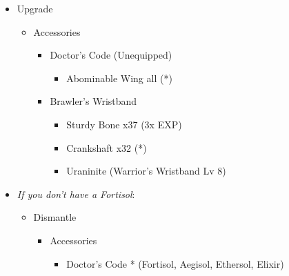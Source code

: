 	\begin{upgrade}
		\begin{itemize}
			\item Upgrade
			      \begin{itemize}
				      \item Accessories
				            \begin{itemize}
					            \item Doctor's Code (Unequipped)
					                  \begin{itemize}
						                  \item Abominable Wing all (*)
					                  \end{itemize}
					            \item Brawler's Wristband
					                  \begin{itemize}
						                  \item Sturdy Bone x37 (3x EXP)
						                  \item Crankshaft x32 (*)
						                  \item Uraninite (Warrior's Wristband Lv 8)
					                  \end{itemize}
				            \end{itemize}
			      \end{itemize}
		    \item \textit{If you don't have a Fortisol}:
			      \begin{itemize}
				      \item Dismantle
				            \begin{itemize}
					            \item Accessories
					                  \begin{flushleft}
						                  \begin{itemize}
							                  \item Doctor's Code * (Fortisol, Aegisol, Ethersol, Elixir)
						                  \end{itemize}
					                  \end{flushleft}
				            \end{itemize}
			      \end{itemize}
		\end{itemize}
	\end{upgrade}
	
